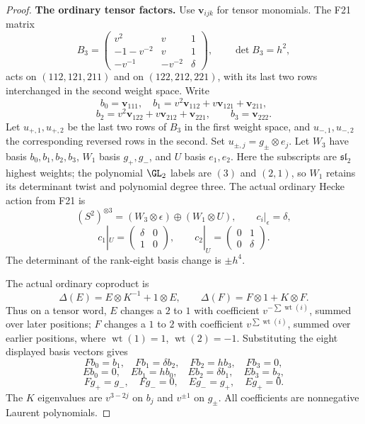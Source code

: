 \documentclass[11pt,a4paper]{article}
\renewcommand{\S}{\ensuremath{\mathsection}}
\newcommand{\fid}[1]{\textsf{#1}}\newcommand{\gate}[1]{\textsf{#1}}
\theoremstyle{named}\newtheorem{finding}{Finding}[section]
\theoremstyle{definition}\newtheorem{definition}[finding]{Definition}
\theoremstyle{remark}\newtheorem{remark}[finding]{Remark}
\begin{document}
\begin{proof}
\par\smallskip\noindent\textbf{The ordinary tensor factors.}\quad
Use $\mathbf v_{ijk}$ for tensor monomials. The F21 matrix
\[
 B_3=\begin{pmatrix}
 v^2&v&1\\-1-v^{-2}&v&1\\-v^{-1}&-v^{-2}&\delta
 \end{pmatrix},\qquad \det B_3=h^2,
\]
acts on $(112,121,211)$ and on $(122,212,221)$, with its last
two rows interchanged in the second weight space. Write
\[
 b_0=\mathbf v_{111},\quad
 b_1=v^2\mathbf v_{112}+v\mathbf v_{121}+\mathbf v_{211},
\]
\[
 b_2=v^2\mathbf v_{122}+v\mathbf v_{212}+\mathbf v_{221},
 \qquad b_3=\mathbf v_{222}.
\]
Let $u_{+,1},u_{+,2}$ be the last two rows of $B_3$ in the first
weight space, and $u_{-,1},u_{-,2}$ the corresponding reversed
rows in the second. Set $u_{\pm,j}=g_\pm\otimes e_j$.
Let $W_3$ have basis $b_0,b_1,b_2,b_3$, $W_1$ basis $g_+,g_-$,
and $U$ basis $e_1,e_2$.
Here the subscripts are $\mathfrak{sl}_2$ highest weights;
the polynomial $\GL_2$ labels are $(3)$ and $(2,1)$, so
$W_1$ retains its determinant twist and polynomial degree three.
The actual ordinary Hecke action from \fid{F21} is
\[
 (S^2)^{\otimes3}=(W_3\otimes\epsilon)\oplus(W_1\otimes U),
 \qquad c_i|_\epsilon=\delta,
\]
\[
 c_1|_U=\begin{pmatrix}\delta&0\\1&0\end{pmatrix},\qquad
 c_2|_U=\begin{pmatrix}0&1\\0&\delta\end{pmatrix}.
\]
The determinant of the rank-eight basis change is $\pm h^4$.

The actual ordinary coproduct is
\cite[\S4.1, equation~(29), p.~22]{IV}
\[
 \Delta(E)=E\otimes K^{-1}+1\otimes E,
 \qquad\Delta(F)=F\otimes1+K\otimes F.
\]
Thus on a tensor word, $E$ changes a $2$ to $1$ with coefficient
$v^{-\sum\operatorname{wt}(i)}$, summed over later positions;
$F$ changes a $1$ to $2$ with coefficient
$v^{\sum\operatorname{wt}(i)}$, summed over earlier positions,
where $\operatorname{wt}(1)=1$, $\operatorname{wt}(2)=-1$.
Substituting the eight displayed basis vectors gives
\[
 Fb_0=b_1,\quad Fb_1=\delta b_2,\quad Fb_2=hb_3,\quad Fb_3=0,
\]
\[
 Eb_0=0,\quad Eb_1=hb_0,\quad Eb_2=\delta b_1,\quad Eb_3=b_2,
\]
\[
 Fg_+=g_-,\quad Fg_-=0,\quad Eg_-=g_+,\quad Eg_+=0.
\]
The $K$ eigenvalues are $v^{3-2j}$ on $b_j$ and $v^{\pm1}$
on $g_\pm$. All coefficients are nonnegative Laurent polynomials.


\end{proof}
\end{document}
